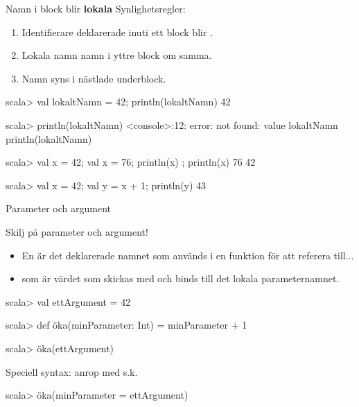 \begin{Slide}{Namn i block blir \textbf{lokala}}
Synlighetsregler:
\begin{enumerate}
\item Identifierare deklarerade inuti ett block blir .

\item Lokala namn  namn i yttre block om samma.


\item Namn syns i nästlade underblock.

\end{enumerate}

\begin{REPL}
scala> { val lokaltNamn = 42; println(lokaltNamn) }
42

scala> println(lokaltNamn)
<console>:12: error: not found: value lokaltNamn
       println(lokaltNamn)

scala> { val x = 42; { val x = 76; println(x) }; println(x) }
76
42

scala> { val x = 42; { val y = x + 1; println(y) } }
43
\end{REPL}

\end{Slide}


\begin{Slide}{Parameter och argument}

Skilj på parameter och argument!
\begin{itemize}
\item En  är det deklarerade namnet som används  i en funktion för att referera till...

\item {} som är värdet som skickas med  och binds till det lokala parameternamnet.

\end{itemize}


\begin{REPLnonum}
scala> val ettArgument = 42

scala> def öka(minParameter: Int) = minParameter + 1

scala> öka(ettArgument)
\end{REPLnonum}


Speciell syntax: anrop med s.k. 
\begin{REPLnonum}
scala> öka(minParameter = ettArgument)
\end{REPLnonum}

\end{Slide}

